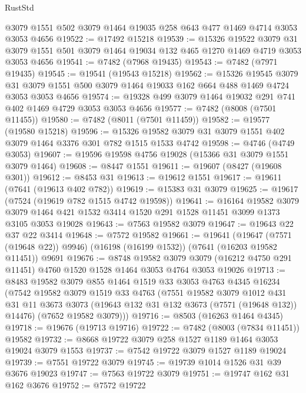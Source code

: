 \begin{lexlean}{RustStd}
\begin{coremodule}
{\begin{coremodule}
{{{{{{{{{{{{{{{{{{{{{{{{{{{{{{{{    @3079
    @1551
    @502
    @3079
    @1464
    @19035
    @258
    @643
    @477
    @1469
    @4714
    @3053
    @3053
    @4656
@19522 := @17492 @15218
@19539 := @15326
    @19522
    @3079
    @31
    @3079
    @1551
    @501
    @3079
    @1464
    @19034
    @132
    @465
    @1270
    @1469
    @4719
    @3053
    @3053
    @4656
@19541 := @7482 (@7968 @19435)
@19543 := @7482 (@7971 @19435)
@19545 := @19541 (@19543 @15218)
@19562 := @15326
    @19545
    @3079
    @31
    @3079
    @1551
    @500
    @3079
    @1464
    @19033
    @162
    @664
    @488
    @1469
    @4724
    @3053
    @3053
    @4656
@19574 := @19328 @499 @3079 @1464 @19032 @291 @741 @402 @1469 @4729 @3053 @3053 @4656
@19577 := @7482 (@8008 (@7501 @11455))
@19580 := @7482 (@8011 (@7501 @11459))
@19582 := @19577 (@19580 @15218)
@19596 := @15326 @19582 @3079 @31 @3079 @1551 @402 @3079 @1464 @3376 @301 @782 @1515 @1533 @4742
@19598 := @4746 (@4749 @3053)
@19607 := @19596 @19598 @4756 @19028 (@15366 @31 @3079 @1551 @3079 @1464)
@19608 := @8447 @1551
@19611 := @19607 (@8427 (@19608 @301))
@19612 := @8453 @31
@19613 := @19612 @1551
@19617 := @19611 (@7641 (@19613 @402 @782))
@19619 := @15383 @31 @3079
@19625 := @19617 (@7524 (@19619 @782 @1515 @4742 @19598))
@19641 := @16164
    @19582
    @3079
    @3079
    @1464
    @421
    @1532
    @3414
    @1520
    @291
    @1528
    @11451
    @3099
    @1373
    @3105
    @3053
    @19028
@19643 := @7563 @19582 @3079
@19647 := @19643 @22 @37 @22 @3414
@19648 := @7572 @19582
@19661 := @19641
    (@19647 (@7571 (@19648 @22)) @9946)
    (@16198 (@16199 @1532))
    (@7641 (@16203 @19582 @11451))
    @9691
@19676 := @8748
    @19582
    @3079
    @3079
    (@16212 @4750 @291 @11451)
    @4760
    @1520
    @1528
    @1464
    @3053
    @4764
    @3053
    @19026
@19713 := @8483
    @19582
    @3079
    @855
    @1464
    @1519
    @33
    @3053
    @4763
    @4345
    @16234
    (@7542
      @19582
      @3079
      @1519
      @33
      @4763
      (@7551
        @19582
        @3079
        @1012
        @431
        @31
        @11
        @3673
        @3073
        (@19643 @132 @31 @132 @3673 (@7571 (@19648 @132)) @14476)
        (@7652 @19582 @3079)))
@19716 := @8503 (@16263 @1464 @4345)
@19718 := @19676 (@19713 @19716)
@19722 := @7482 (@8003 (@7834 @11451)) @19582
@19732 := @8668 @19722 @3079 @258 @1527 @1189 @1464 @3053 @19024 @3079 @1553
@19737 := @7542 @19722 @3079 @1527 @1189 @19024
@19739 := @7551 @19722 @3079
@19745 := @19739 @1014 @1526 @31 @39 @3676 @19023
@19747 := @7563 @19722 @3079
@19751 := @19747 @162 @31 @162 @3676
@19752 := @7572 @19722
}}}}}}}}}}}}}}}}}}}}}}}}}}}}}}}}
\end{coremodule}}
\end{coremodule}
\end{lexlean}
